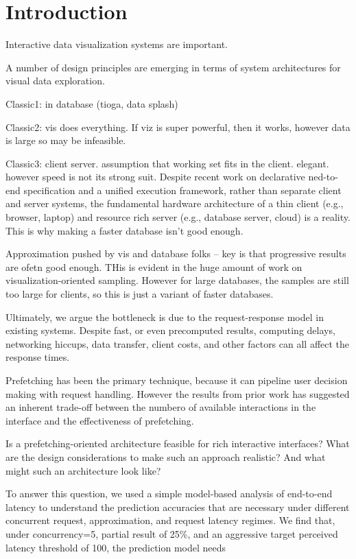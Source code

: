 
\section{Introduction}

\label{s:intro}

Interactive data visualization systems are important. 

A number of design principles are emerging in terms of system architectures
for visual data exploration.

Classic1: in database (tioga, data splash)

Classic2: vis does everything.  If viz is super powerful, then it works, however data is large so may be infeasible.

Classic3: client server.  assumption that working set fits in the client.  elegant.  however speed is not its strong suit.
Despite recent work on declarative ned-to-end specification and a unified execution framework, rather than separate client and server systems, the fundamental hardware architecture of a thin client (e.g., browser, laptop) and resource rich server (e.g., database server, cloud) is a reality.
This is why making a faster database isn't good enough.

Approximation pushed by vis and database folks -- key is that progressive results are ofetn good enough.  THis is evident in the huge amount of work on visualization-oriented sampling.  However for large databases, the samples are still too large for clients, so this is just a variant of faster databases.

Ultimately, we argue the bottleneck is due to the request-response model in existing systems.    Despite fast, or even precomputed results, computing delays, networking hiccups, data transfer, client costs, and other factors can all affect the response times.

Prefetching has been the primary technique, because it can pipeline user decision making with request handling.  However the results from prior work has suggested an inherent trade-off between the numbero of available interactions in the interface and the effectiveness of prefetching.

Is a prefetching-oriented architecture feasible for rich interactive interfaces?  What are the design considerations to make such an approach realistic?  And what might such an architecture look like?

To answer this question, we used a simple model-based analysis of end-to-end latency to understand the prediction accuracies that are necessary under different concurrent request, approximation, and request latency regimes.  We find that, under concurrency=5, partial result of 25\%, and an aggressive target perceived latency threshold of 100, the prediction model needs 


